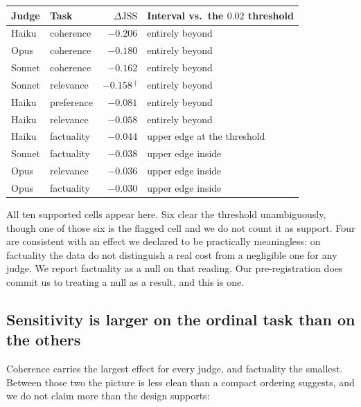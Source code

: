 \begin{center}
\begin{tabular}{llrl}
\toprule
Judge & Task & $\Delta\mathrm{JSS}$ & Interval vs.\ the $0.02$ threshold \\
\midrule
Haiku  & coherence  & $-0.206$ & entirely beyond \\
Opus   & coherence  & $-0.180$ & entirely beyond \\
Sonnet & coherence  & $-0.162$ & entirely beyond \\
Sonnet & relevance  & $-0.158$\,$^{\dagger}$ & entirely beyond \\
Haiku  & preference & $-0.081$ & entirely beyond \\
Haiku  & relevance  & $-0.058$ & entirely beyond \\
\midrule
Haiku  & factuality & $-0.044$ & upper edge at the threshold \\
Sonnet & factuality & $-0.038$ & upper edge inside \\
Opus   & relevance  & $-0.036$ & upper edge inside \\
Opus   & factuality & $-0.030$ & upper edge inside \\
\bottomrule
\end{tabular}
\end{center}


All ten supported cells appear here. Six clear the threshold unambiguously,
though one of those six is the flagged cell and we do not count it as support.
Four are consistent with an effect we declared to be practically meaningless: on
factuality the data do not distinguish a real cost from a negligible one for any
judge. We report factuality as a null on that reading. Our pre-registration does
commit us to treating a null as a result, and this is one.

\subsection{Sensitivity is larger on the ordinal task than on the others}

Coherence carries the largest effect for every judge, and factuality the
smallest. Between those two the picture is less clean than a compact ordering
suggests, and we do not claim more than the design supports:

